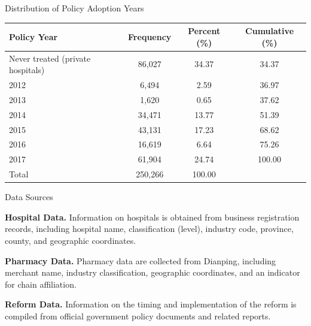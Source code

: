 \documentclass{beamer}
\begin{document}
\begin{frame}{Distribution of Policy Adoption Years}

\centering
\footnotesize

\begin{tabular}{lccc}
\hline
\hline
Policy Year & Frequency & Percent (\%) & Cumulative (\%) \\
\hline
Never treated (private hospitals) & 86,027 & 34.37 & 34.37 \\
2012 & 6,494 & 2.59 & 36.97 \\
2013 & 1,620 & 0.65 & 37.62 \\
2014 & 34,471 & 13.77 & 51.39 \\
2015 & 43,131 & 17.23 & 68.62 \\
2016 & 16,619 & 6.64 & 75.26 \\
2017 & 61,904 & 24.74 & 100.00 \\
\hline
Total & 250,266 & 100.00 & \\
\hline
\hline
\end{tabular}

\end{frame}


\begin{frame}{Data Sources}

\textbf{Hospital Data.} Information on hospitals is obtained from business registration records, including hospital name, classification (level), industry code, province, county, and geographic coordinates.

\medskip

\textbf{Pharmacy Data.} Pharmacy data are collected from Dianping, including merchant name, industry classification, geographic coordinates, and an indicator for chain affiliation.

\medskip

\textbf{Reform Data.} Information on the timing and implementation of the reform is compiled from official government policy documents and related reports.

\end{frame}
\end{document}
